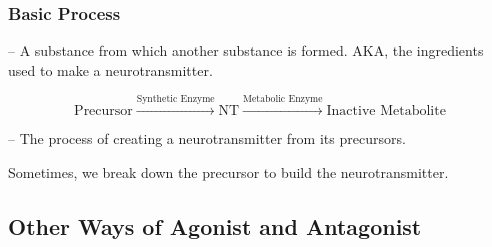 \subsubsection{Basic Process}

\begin{coloredlist}
    \item {} -- A substance from which another substance is formed. AKA, the ingredients used to make a neurotransmitter.
    \item \[
        \text{Precursor} \xrightarrow{\text{Synthetic Enzyme}} \text{NT} \xrightarrow{\text{Metabolic Enzyme}} \text{Inactive Metabolite}
    \]
    \begin{coloredlist}
        \item {} -- The process of creating a neurotransmitter from its precursors.
        \item Sometimes, we break down the precursor to build the neurotransmitter.
    \end{coloredlist}
\end{coloredlist}


\subsection{Other Ways of Agonist and Antagonist}

